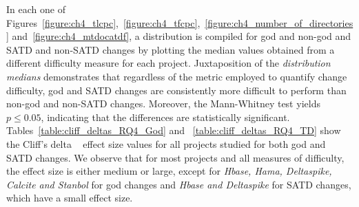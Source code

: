 {%

In each one of Figures~\ref{figure:ch4_tlcpc},~\ref{figure:ch4_tfcpc},~\ref{figure:ch4_number_of_directories} and~\ref{figure:ch4_mtdocatdf}, a distribution is compiled for god and non-god and SATD and non-SATD changes by plotting the median values obtained from a different difficulty measure for each project. Juxtaposition of the \textit{distribution medians} demonstrates that regardless of the metric employed to quantify change difficulty, god and SATD changes are consistently more difficult to perform than non-god and non-SATD changes. Moreover, the Mann-Whitney test \cite{mann1947test} yields $p \le 0.05$, indicating that the differences are statistically significant. Tables~\ref{table:cliff_deltas_RQ4_God} and ~\ref{table:cliff_deltas_RQ4_TD} show the Cliff's delta ~\cite{Cliff:2005} effect size values for all projects studied for both god and SATD changes. We observe that for most projects and all measures of difficulty, the effect size is either medium or large, except for \textit{Hbase, Hama, Deltaspike, Calcite and Stanbol} for god changes and \textit{Hbase and Deltaspike} for SATD changes, which have a small effect size.\\

\begin{landscape}
	\begin{table}[!htbp]

	\small
	\centering



\end{table}
\end{landscape}}
